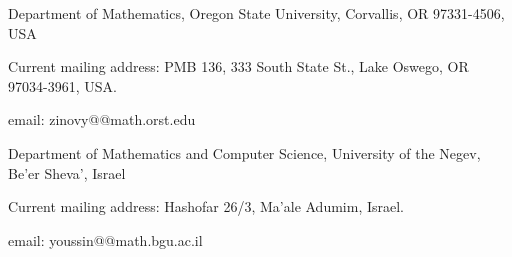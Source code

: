 \smallskip

\noindent Department of Mathematics, Oregon State University,
Corvallis, OR 97331-4506, USA

\noindent Current mailing address: 
PMB 136, 333 South State St., Lake Oswego, OR 97034-3961, USA.

\noindent email: zinovy@@math.orst.edu 

\smallskip

\noindent
Department of Mathematics and Computer Science,
University of the Negev, Be'er Sheva', Israel

\noindent
Current mailing address: Hashofar 26/3, Ma'ale Adumim, Israel.

\noindent
email: youssin@@math.bgu.ac.il


\bigskip
\bigskip


\begingroup %



\ifx\mathbb\undefined \newcommand{\mathbb}{\Bbb}\else\fi



\let \cedilla =\c
\renewcommand{\c}[0]{{\mathbb C}}  
\let \crossedo =\o
\renewcommand{\o}[0]{{\cal O}} 
\newcommand{\z}[0]{{\mathbb Z}}
\newcommand{\n}[0]{{\mathbb N}}

\renewcommand{\r}[0]{{\mathbb R}} %

\renewcommand{\a}[0]{{\mathbb A}} 


\newcommand{\p}[0]{{\mathbb P}}
\newcommand{\f}[0]{{\mathbb F}}
\newcommand{\q}[0]{{\mathbb Q}}
\newcommand{\map}[0]{\dasharrow}
\newcommand{\qtq}[1]{\quad\mbox{#1}\quad}
\newcommand{\spec}[0]{\operatorname{Spec}}
\newcommand{\pic}[0]{\operatorname{Pic}}
\newcommand{\gal}[0]{\operatorname{Gal}}
\newcommand{\cont}[0]{\operatorname{cont}}
\newcommand{\mult}[0]{\operatorname{mult}}
\newcommand{\discrep}[0]{\operatorname{discrep}}
\newcommand{\totaldiscrep}[0]{\operatorname{totaldiscrep}}

